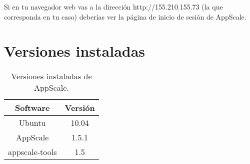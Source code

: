 Si en tu navegador web vas a la dirección http://155.210.155.73 (la que corresponda en tu caso) deberías ver la página de inicio de sesión de AppScale.


\section{Versiones instaladas}

\begin{table}[!htbp]
\centering
   \begin{tabular}{|c|c|}
      \hline
      \textbf{Software} & \textbf{Versión} \\ \hline
      Ubuntu & 10.04 \\ \hline
      AppScale & 1.5.1 \\ \hline
      appscale-tools & 1.5 \\ \hline
   \end{tabular}
\caption{Versiones instaladas de AppScale.}
\label{table:puppet-versions}
\end{table}
